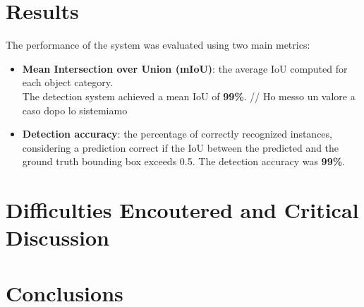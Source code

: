 \documentclass[10.5pt,a4paper]{article}
\begin{document}
\section*{Results}
The performance of the system was evaluated using two main metrics:
\begin{itemize}
    \item \textbf{Mean Intersection over Union (mIoU)}: the average IoU computed for each object category. \\The detection system achieved a mean IoU of \textbf{99\%}.  // Ho messo un valore a caso dopo lo sistemiamo
    \item \textbf{Detection accuracy}: the percentage of correctly recognized instances, considering a prediction correct if the IoU between the predicted and the ground truth bounding box exceeds 0.5. The detection accuracy was \textbf{99\%}.
\end{itemize}




\section*{Difficulties Encoutered and Critical Discussion}

\section*{Conclusions}
\end{document}
